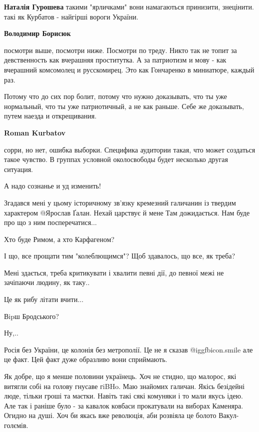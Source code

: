 \begin{itemize}
\begin{itemize}
\textbf{Наталія Гурошева} такими "ярличками" вони намагаються принизити, знецінити. такі як Курбатов - найгірші вороги України.

\textbf{Володимир Борисюк} 

посмотри выше, посмотри ниже. Посмотри по треду. Никто так не топит за
девственность как вчерашняя проститутка. А за патриотизм и мову - как вчерашний
комсомолец и русскомирец. Это как Гончаренко в миниатюре, каждый раз.


Потому что до сих пор болит, потому что нужно доказывать, что ты уже
нормальный, что ты уже патриотичный, а не как раньше. Себе же доказывать, путем
наезда и открещивания.


\textbf{Roman Kurbatov} 

сорри, но нет, ошибка выборки. Специфика аудитории такая, что может создаться
такое чувство. В группах условной околосвободы будет несколько другая ситуация.

\end{itemize} %

А надо сознанье и уд изменить!


Згадався мені у цьому історичному зв'язку кремезний галичанин із твердим
характером @Ярослав Ґалан. Нехай царствує й мене Там дожидається. Нам буде про
що з ним посперечатися...


Хто буде Римом, а хто Карфагеном?


І що, все прощати тим "колеблющимся"? Щоб здавалось, що все, як треба?

Мені здається, треба критикувати і хвалити певні дії, до певної межі не зачіпаючи людину, як таку..

Це як рибу літати вчити...

Вipш Бродського?

Ну,..

Росія без України, це колонія без метрополії. Це не я сказав
@igg{fbicon.smile}  але це факт. Цей факт дуже образливо вони сприймають.


\obeycr
Як добре, що я менше половини українець.
Хоч не стидно, що малорос, які витягли собі на голову гнусаве гiBHo.
Маю знайомих галичан.
Якісь безідейні люде, тільки гроші та маєтки.
Навіть такі сякі комуняки і то мали якусь ідею.
Але так і раніше було - за кавалок ковбаси прокатували на виборах Каменяра.
Огидно на душі.
Хоч би якась вже революція, аби розвіяла це болото Вакул-голємів.
\restorecr


\end{itemize}
